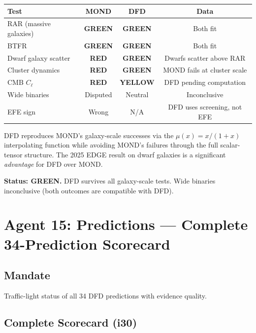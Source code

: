 \documentclass[11pt,a4paper]{article}
\newcommand{\GREEN}{\textcolor{dfdgreen}{\textbf{GREEN}}}
\newcommand{\YELLOW}{\textcolor{dfdyellow}{\textbf{YELLOW}}}
\newcommand{\RED}{\textcolor{dfdred}{\textbf{RED}}}
\begin{document}
\begin{center}
\begin{tabular}{lccc}
\toprule
\textbf{Test} & \textbf{MOND} & \textbf{DFD} & \textbf{Data} \\
\midrule
RAR (massive galaxies) & \GREEN & \GREEN & Both fit \\
BTFR & \GREEN & \GREEN & Both fit \\
Dwarf galaxy scatter & \RED & \GREEN & Dwarfs scatter above RAR \\
Cluster dynamics & \RED & \GREEN & MOND fails at cluster scale \\
CMB $C_\ell$ & \RED & \YELLOW & DFD pending computation \\
Wide binaries & Disputed & Neutral & Inconclusive \\
EFE sign & Wrong & N/A & DFD uses screening, not EFE \\
\bottomrule
\end{tabular}
\end{center}

DFD reproduces MOND's galaxy-scale successes via the $\mu(x) = x/(1+x)$ interpolating function while avoiding MOND's failures through the full scalar-tensor structure. The 2025 EDGE result on dwarf galaxies is a significant \emph{advantage} for DFD over MOND.

\textbf{Status: \GREEN.} DFD survives all galaxy-scale tests. Wide binaries inconclusive (both outcomes are compatible with DFD).

\section{Agent 15: Predictions --- Complete 34-Prediction Scorecard}

\subsection{Mandate}
Traffic-light status of all 34 DFD predictions with evidence quality.

\subsection{Complete Scorecard (i30)}
\end{document}
